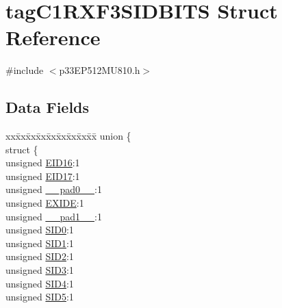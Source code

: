 \hypertarget{structtag_c1_r_x_f3_s_i_d_b_i_t_s}{}\section{tag\+C1\+R\+X\+F3\+S\+I\+D\+B\+I\+TS Struct Reference}
\label{structtag_c1_r_x_f3_s_i_d_b_i_t_s}


{\ttfamily \#include $<$p33\+E\+P512\+M\+U810.\+h$>$}

\subsection*{Data Fields}
\begin{DoxyCompactItemize}
\item 
\begin{tabbing}
xx\=xx\=xx\=xx\=xx\=xx\=xx\=xx\=xx\=\kill
union \{\\
\>struct \{\\
\>\>unsigned \hyperlink{structtag_c1_r_x_f3_s_i_d_b_i_t_s_a6dd5663b0c9838c56db040560ca0efa1}{EID16}:1\\
\>\>unsigned \hyperlink{structtag_c1_r_x_f3_s_i_d_b_i_t_s_aa648615464b0eb29967529333eee9fd9}{EID17}:1\\
\>\>unsigned \hyperlink{structtag_c1_r_x_f3_s_i_d_b_i_t_s_adf71f3d8410c1f1dbbc96680a92c49af}{\_\_pad0\_\_}:1\\
\>\>unsigned \hyperlink{structtag_c1_r_x_f3_s_i_d_b_i_t_s_a09ff1c1be3927220bd3dfbc10edfe243}{EXIDE}:1\\
\>\>unsigned \hyperlink{structtag_c1_r_x_f3_s_i_d_b_i_t_s_acaf2d0924a107ec6e8d2e31febaf66f9}{\_\_pad1\_\_}:1\\
\>\>unsigned \hyperlink{structtag_c1_r_x_f3_s_i_d_b_i_t_s_a1ca276ac15df60e1f7b9a6d0011ade93}{SID0}:1\\
\>\>unsigned \hyperlink{structtag_c1_r_x_f3_s_i_d_b_i_t_s_a3405d354f81391f879648f69f504dfc8}{SID1}:1\\
\>\>unsigned \hyperlink{structtag_c1_r_x_f3_s_i_d_b_i_t_s_ad744966dfc49307f731b7045b01b94e5}{SID2}:1\\
\>\>unsigned \hyperlink{structtag_c1_r_x_f3_s_i_d_b_i_t_s_a9345f3e64720be93e83d8dfc827f3f45}{SID3}:1\\
\>\>unsigned \hyperlink{structtag_c1_r_x_f3_s_i_d_b_i_t_s_aefb106fed4bb40e2c3c71ac612c554e3}{SID4}:1\\
\>\>unsigned \hyperlink{structtag_c1_r_x_f3_s_i_d_b_i_t_s_a0f221b3c9612231686bf87ccdcec8489}{SID5}:1\\

\end{tabbing}
\end{DoxyCompactItemize}
